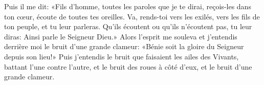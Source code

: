 Puis il me dit: «Fils d’homme, toutes les paroles que je te dirai,
	reçois-les dans ton cœur, écoute de toutes tes oreilles.
Va, rends-toi vers les exilés, vers les fils de ton peuple, et tu leur parleras.
Qu’ils écoutent ou qu’ils n’écoutent pas, tu leur diras:
	Ainsi parle le Seigneur Dieu.»
Alors l’esprit me souleva et j’entendis derrière moi le bruit d’une grande clameur:
	«Bénie soit la gloire du Seigneur depuis son lieu!»
Puis j’entendis le bruit que faisaient les ailes des Vivants,
		battant l’une contre l’autre,
	et le bruit des roues à côté d’eux, et le bruit d’une grande clameur.
